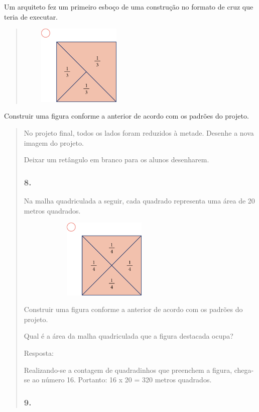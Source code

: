 \begin{enumerate}
\begin{escolha}
\begin{enumerate}
\begin{itemize}
\begin{itemize}
\begin{escolha}
Um arquiteto fez um primeiro esboço de uma construção no formato de cruz
que teria de executar.

\begin{quote}
\includegraphics[width=2.27520in,height=1.51680in]{media/image66.png}
\end{quote}

Construir uma figura conforme a anterior de acordo com os padrões do
projeto.

\begin{quote}
No projeto final, todos os lados foram reduzidos à metade. Desenhe
a nova imagem do projeto.

\Paulo Deixar um retângulo em branco para os alunos desenharem.

\subsubsection{8.}\label{section-59}

Na malha quadriculada a seguir, cada quadrado representa uma área de 20
metros quadrados.

\includegraphics[width=3.33333in,height=1.50517in]{media/image68.png}

Construir uma figura conforme a anterior de acordo com os padrões do
projeto.

Qual é a área da malha quadriculada que a figura destacada ocupa?

Resposta:

Realizando-se a contagem de quadradinhos que preenchem a figura, chega-se
ao número 16. Portanto: 16 x 20 = 320 metros quadrados.

\subsubsection{9.}\label{section-60}


\end{quote}
\end{escolha}
\end{itemize}
\end{itemize}
\end{enumerate}
\end{escolha}
\end{enumerate}
